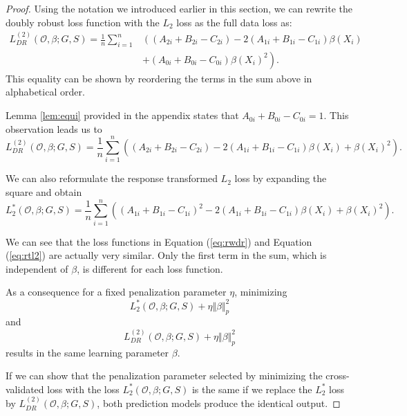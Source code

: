 \documentclass[12pt, a4paper]{scrartcl}
\theoremstyle{definition}
\theoremstyle{plain}
\numberwithin{equation}{section}
\numberwithin{figure}{section}
\numberwithin{table}{section}
\begin{document}
	\begin{proof}
		Using the notation we introduced earlier in this section, we can rewrite the doubly robust loss function with the $L_2$ loss as the full data loss as:
		\begin{equation}\label{eq:rwdr}
		\begin{split}
		L_{DR}^{(2)}(\mathcal{O}, \beta; G,S) = \frac{1}{n} \sum_{i=1}^n & \left((A_{2i}+B_{2i}-C_{2i}) - 2(A_{1i}+B_{1i}-C_{1i})\beta(X_i) \right.\\
		& \left.+ (A_{0i}+B_{0i}-C_{0i})\beta(X_i)^2\right).
		\end{split}
		\end{equation}
		This equality can be shown by reordering the terms in the sum above in alphabetical order.
		
		Lemma \ref{lem:equi} provided in the appendix states that $A_{0i}+B_{0i}-C_{0i} = 1$.
		This observation leads us to
		\begin{equation*}
		L_{DR}^{(2)}(\mathcal{O}, \beta; G,S) = \frac{1}{n} \sum_{i=1}^n  \left((A_{2i}+B_{2i}-C_{2i}) - 2(A_{1i}+B_{1i}-C_{1i})\beta(X_i) + \beta(X_i)^2\right).
		\end{equation*}
		
		We can also reformulate the response transformed $L_2$ loss by expanding the square and obtain
		\begin{equation}\label{eq:rtl2}
		L_2^*(\mathcal{O}, \beta; G,S) = \frac{1}{n} \sum_{i=1}^n \left((A_{1i}+B_{1i}-C_{1i})^2 - 2 (A_{1i}+B_{1i}-C_{1i}) \beta(X_i)+\beta(X_i)^2\right).
		\end{equation}
		
		We can see that the loss functions in Equation (\ref{eq:rwdr}) and Equation (\ref{eq:rtl2}) are actually very similar.
		Only the first term in the sum, which is independent of $\beta$, is different for each loss function.
	
		As a consequence for a fixed penalization parameter $\eta$, minimizing 
		\begin{equation*}
		L_2^*(\mathcal{O}, \beta; G,S) + \eta \Vert \beta \Vert_p^2
		\end{equation*}
		and 
		\begin{equation*}
		L_{DR}^{(2)}(\mathcal{O}, \beta; G,S) + \eta \Vert \beta \Vert_p^2
		\end{equation*}
		 results in the same learning parameter $\beta$.
		 
		 If we can show that the penalization parameter selected by minimizing the cross-validated loss with the loss $L_2^*(\mathcal{O}, \beta; G,S)$ is the same if we replace the $L_2^*$ loss by $L_{DR}^{(2)}(\mathcal{O}, \beta; G,S)$, both prediction models produce the identical output.
		

\end{proof}
\end{document}
